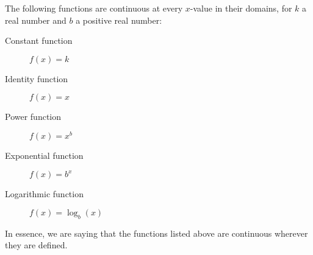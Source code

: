 \documentclass{ximera}
\begin{document}
 
\begin{remark}
The following functions are continuous at every $x$-value in their domains, for $k$ a real number and $b$ a positive real number:
\begin{description}
\item[Constant function] $f(x) =k$
\item[Identity function] $f(x) = x$
\item[Power function] $f(x)=x^b$
\item[Exponential function] $f(x)=b^x$
\item[Logarithmic function] $f(x)=\log_b(x)$
\end{description}
In essence, we are saying that the functions listed above are
continuous wherever they are defined.
 
\end{remark}
 
 
 

 
\end{document}
